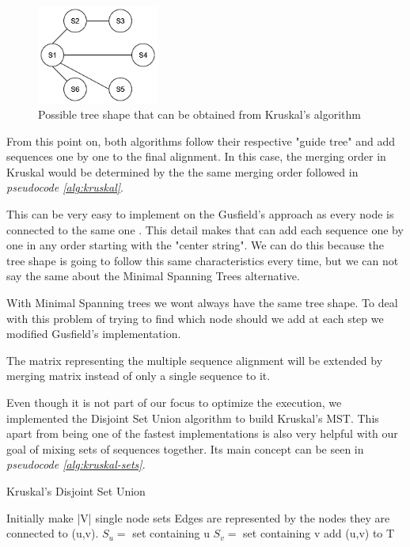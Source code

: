\documentclass[twoside,openright,titlepage,numbers=noenddot,headinclude,%
                footinclude=true,cleardoublepage=empty,abstractoff, %
                BCOR=5mm,paper=a4,fontsize=11pt,%
                ngerman,american,%
                ]{scrreprt}
\begin{document}
\begin{figure}[h]
\includegraphics[width=4cm]{report/mst2.png}
\centering
\caption{Possible tree shape that can be obtained from Kruskal's algorithm}
\label{fig:mst_graph}
\end{figure}

From this point on, both algorithms follow their respective "guide tree" and add sequences one by one to the final alignment. In this case, the merging order in Kruskal would be determined by the the same merging order followed in \textit{pseudocode \ref{alg:kruskal}}.

This can be very easy to implement on the Gusfield's approach as every node is connected to the same one \cite{Gusfield_1997}. This detail makes that can add each sequence one by one in any order starting with the "center string". We can do this because the tree shape is going to follow this same characteristics every time, but we can not say the same about the Minimal Spanning Trees alternative.

With Minimal Spanning trees we wont always have the same tree shape. To deal with this problem of trying to find which node should we add at each step we modified Gusfield's implementation.

The matrix representing the multiple sequence alignment will be extended by merging matrix instead of only a single sequence to it.

Even though it is not part of our focus to optimize the execution, we implemented the Disjoint Set Union algorithm \cite{disjointsetunion} to build Kruskal's MST. This apart from being one of the fastest implementations is also very helpful with our goal of mixing sets of sequences together. Its main concept can be seen in \textit{pseudocode \ref{alg:kruskal-sets}}. 

\begin{algorithm}
	\caption{Kruskal's Disjoint Set Union} 
    \label{alg:kruskal-sets}
	\begin{algorithmic}[1]
        \State Initially make |V| single node sets
        \State Edges are represented by the nodes they are connected to (u,v).
            \State $S_u =$ set containing u
            \State $S_v =$ set containing v
		          \State add (u,v) to T
		      \EndIf
		\EndFor
	\end{algorithmic} 
\end{algorithm}
\end{document}
